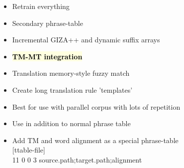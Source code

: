 \documentclass[landscape]{uedslides2C}
\newcommand{\currenttopic}[1]{\colorbox{lightyellow}{\textcolor{black}{\bf #1}}}
\begin{document}
% 
% 
% 
% 
% 
% 


\begin{itemize}
\item Retrain everything
\item Secondary phrase-table
\item Incremental GIZA++ and dynamic suffix arrays
\item \currenttopic{TM-MT integration}

\end{itemize}



\begin{itemize}
\item Translation memory-style fuzzy match
\item Create long translation rule 'templates'
\item Best for use with parallel corpus with lots of repetition

\item Use in addition to normal phrase table
\item Add TM and word alignment as a special phrase-table
   \\ {[}ttable-file{]}
   \\ 11 0 0 3 source.path;target.path;alignment 

\end{itemize}
\end{document}
